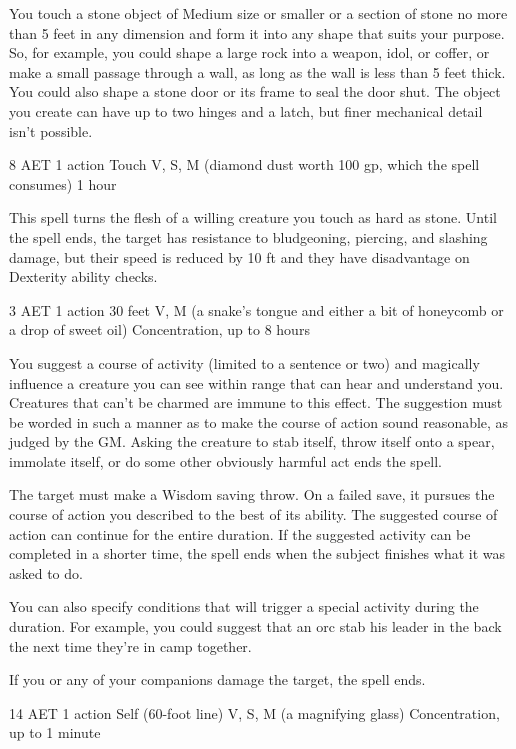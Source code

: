 You touch a stone object of Medium size or smaller or a section of stone no more than 5 feet in any dimension and form it into any shape that suits your purpose. So, for example, you could shape a large rock into a weapon, idol, or coffer, or make a small passage through a wall, as long as the wall is less than 5 feet thick. You could also shape a stone door or its frame to seal the door shut. The object you create can have up to two hinges and a latch, but finer mechanical detail isn't possible.

\label{spell:stoneskin}
{8 AET}
{1 action}
{Touch}
{V, S, M (diamond dust worth 100 gp, which the spell consumes)}
{1 hour}

This spell turns the flesh of a willing creature you touch as hard as stone. Until the spell ends, the target has resistance to bludgeoning, piercing, and slashing damage, but their speed is reduced by 10 ft and they have disadvantage on Dexterity ability checks.

\label{spell:suggestion}
{3 AET}
{1 action}
{30 feet}
{V, M (a snake's tongue and either a bit of honeycomb or a drop of sweet oil)}
{Concentration, up to 8 hours}

You suggest a course of activity (limited to a sentence or two) and magically influence a creature you can see within range that can hear and understand you. Creatures that can't be charmed are immune to this effect. The suggestion must be worded in such a manner as to make the course of action sound reasonable, as judged by the GM. Asking the creature to stab itself, throw itself onto a spear, immolate itself, or do some other obviously harmful act ends the spell.

The target must make a Wisdom saving throw. On a failed save, it pursues the course of action you described to the best of its ability. The suggested course of action can continue for the entire duration. If the suggested activity can be completed in a shorter time, the spell ends when the subject finishes what it was asked to do.

You can also specify conditions that will trigger a special activity during the duration. For example, you could suggest that an orc stab his leader in the back the next time they're in camp together.

If you or any of your companions damage the target, the spell ends.

\label{spell:sunbeam}
{14 AET}
{1 action}
{Self (60-foot line)}
{V, S, M (a magnifying glass)}
{Concentration, up to 1 minute}

